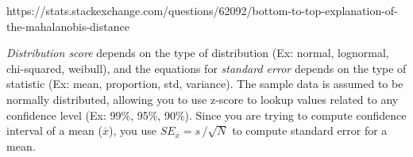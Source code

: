 \documentclass[11pt]{article}
\begin{document}
https://stats.stackexchange.com/questions/62092/bottom-to-top-explanation-of-the-mahalanobis-distance

    \emph{Distribution score} depends on the type of distribution (Ex:
normal, lognormal, chi-squared, weibull), and the equations for
\emph{standard error} depends on the type of statistic (Ex: mean,
proportion, std, variance). The sample data is assumed to be normally
distributed, allowing you to use z-score to lookup values related to any
confidence level (Ex: 99\%, 95\%, 90\%). Since you are trying to compute
confidence interval of a mean (\(\overline{x}\)), you use
\(SE_{\overline{x}} = s\,/\sqrt{N}\) to compute standard error for a
mean.


    
    
    
    
\end{document}
